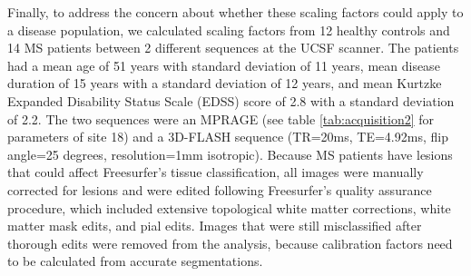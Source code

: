 Finally, to address the concern about whether these scaling factors could apply to a disease population, we calculated scaling factors from 12 healthy controls and 14 MS patients between 2 different sequences at the UCSF scanner. The patients had a mean age of 51 years with standard deviation of 11 years, mean disease duration of 15 years with a standard deviation of 12 years, and mean Kurtzke Expanded Disability Status Scale (EDSS) \cite{Kurtzke_1983} score of 2.8 with a standard deviation of 2.2. The two sequences were an MPRAGE (see table \ref{tab:acquisition2} for parameters of site 18) and a 3D-FLASH sequence (TR=20ms, TE=4.92ms, flip angle=25 degrees, resolution=1mm isotropic). Because MS patients have lesions that could affect Freesurfer's tissue classification, all images were manually corrected for lesions and were edited following Freesurfer's quality assurance procedure, which included extensive topological white matter corrections, white matter mask edits, and pial edits. Images that were still misclassified after thorough edits were removed from the analysis, because calibration factors need to be calculated from accurate segmentations.
